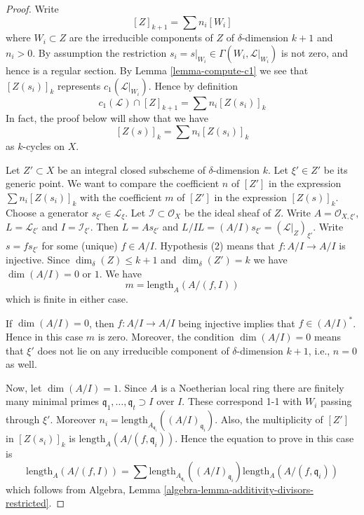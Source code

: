 \begin{proof}
Write
$$
[Z]_{k + 1} = \sum n_i[W_i]
$$
where $W_i \subset Z$ are the irreducible components of
$Z$ of $\delta$-dimension $k + 1$ and $n_i > 0$.
By assumption the restriction
$s_i = s|_{W_i} \in \Gamma(W_i, \mathcal{L}|_{W_i})$ is not
zero, and hence is a regular section. By Lemma \ref{lemma-compute-c1}
we see that $[Z(s_i)]_k$ represents $c_1(\mathcal{L}|_{W_i})$.
Hence by definition
$$
c_1(\mathcal{L}) \cap [Z]_{k + 1} = \sum n_i[Z(s_i)]_k
$$
In fact, the proof below will show that we have
\begin{equation}
\label{equation-equal-as-cycles}
[Z(s)]_k =  \sum n_i[Z(s_i)]_k
\end{equation}
as $k$-cycles on $X$.

\medskip\noindent
Let $Z' \subset X$ be an integral closed subscheme of
$\delta$-dimension $k$. Let $\xi' \in Z'$ be its generic point.
We want to compare the coefficient $n$ of $[Z']$ in the expression
$\sum n_i[Z(s_i)]_k$ with the coefficient $m$ of $[Z']$ in the
expression $[Z(s)]_k$. Choose a generator $s_{\xi'} \in \mathcal{L}_\xi$.
Let $\mathcal{I} \subset \mathcal{O}_X$ be the ideal sheaf of $Z$.
Write $A = \mathcal{O}_{X, \xi'}$, $L = \mathcal{L}_{\xi'}$
and $I = \mathcal{I}_{\xi'}$. Then $L = As_{\xi'}$ and
$L/IL = (A/I)s_{\xi'} = (\mathcal{L}|_Z)_{\xi'}$.
Write $s = f s_{\xi'}$ for some (unique) $f \in A/I$.
Hypothesis (2) means that $f : A/I \to A/I$ is injective.
Since $\dim_\delta(Z) \leq k + 1$ and $\dim_\delta(Z') = k$
we have $\dim(A/I) = 0$ or $1$. We have
$$
m = \text{length}_A(A/(f, I))
$$
which is finite in either case.

\medskip\noindent
If $\dim(A/I) = 0$, then $f : A/I \to A/I$ being injective
implies that $f \in (A/I)^*$. Hence in this case $m$ is zero.
Moreover, the condition $\dim(A/I) = 0$ means that $\xi'$
does not lie on any irreducible component of $\delta$-dimension
$k + 1$, i.e., $n = 0$ as well.

\medskip\noindent
Now, let $\dim(A/I) = 1$.
Since $A$ is a Noetherian local ring there are finitely
many minimal primes $\mathfrak q_1, \ldots, \mathfrak q_t \supset I$
over $I$. These correspond 1-1 with $W_i$ passing through $\xi'$.
Moreover $n_i = \text{length}_{A_{\mathfrak q_i}}((A/I)_{\mathfrak q_i})$.
Also, the multiplicity of $[Z']$ in $[Z(s_i)]_k$ is
$\text{length}_A(A/(f, \mathfrak q_i))$.
Hence the equation to prove in this case is
$$
\text{length}_A(A/(f, I))
=
\sum \text{length}_{A_{\mathfrak q_i}}((A/I)_{\mathfrak q_i})
\text{length}_A(A/(f, \mathfrak q_i))
$$
which follows from
Algebra, Lemma \ref{algebra-lemma-additivity-divisors-restricted}.
\end{proof}




